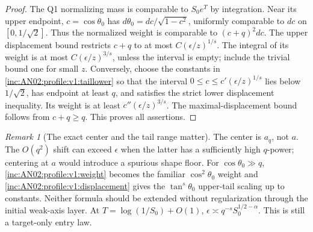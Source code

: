 \documentclass[11pt]{article}
\numberwithin{equation}{section}
\theoremstyle{remark}\newtheorem{remark}[theorem]{Remark}
\begin{document}
\begin{proof}
The Q1 normalizing mass is comparable to $S_0e^T$ by integration. Near its upper endpoint, $c=\cos\theta_0$ has $d\theta_0=dc/\sqrt{1-c^2}$, uniformly comparable to $dc$ on $[0,1/\sqrt2]$. Thus the normalized weight is comparable to $(c+q)^2dc$. The upper displacement bound restricts $c+q$ to at most $C(\epsilon/z)^{1/s}$. The integral of its weight is at most $C(\epsilon/z)^{3/s}$, unless the interval is empty; include the trivial bound one for small $z$. Conversely, choose the constants in \eqref{inc:AN02:profile:v1:taillower} so that the interval $0\le c\le c'(\epsilon/z)^{1/s}$ lies below $1/\sqrt2$, has endpoint at least $q$, and satisfies the strict lower displacement inequality. Its weight is at least $c''(\epsilon/z)^{3/s}$. The maximal-displacement bound follows from $c+q\ge q$. This proves all assertions.
\end{proof}

\begin{remark}[The exact center and the tail range matter]
The center is $a_q$, not $a$. The $O(q^2)$ shift can exceed $\epsilon$ when the latter has a sufficiently high $q$-power; centering at $a$ would introduce a spurious shape floor. For $\cos\theta_0\gg q$, \eqref{inc:AN02:profile:v1:weight} becomes the familiar $\cos^2\theta_0$ weight and \eqref{inc:AN02:profile:v1:displacement} gives the $\tan^s\theta_0$ upper-tail scaling up to constants. Neither formula should be extended without regularization through the initial weak-axis layer. At $T=\log(1/S_0)+O(1)$, $\epsilon\asymp q^{-s}S_0^{1/2-\alpha}$. This is still a target-only entry law.
\end{remark}
\end{document}
